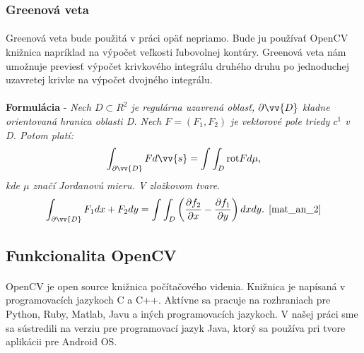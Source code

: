 \documentclass[12pt]{article}
\begin{document}
\subsubsection{Greenová veta}
\paragraph{}
Greenová veta bude použitá v práci opäť nepriamo. Bude ju používať OpenCV knižnica napríklad na výpočet veľkosti ľubovolnej kontúry. Greenová veta nám umožnuje previesť výpočet krivkového integrálu druhého druhu po jednoduchej uzavretej krivke na výpočet dvojného integrálu.
\cite{mat_an_2}	\\ \\
	  	\textbf{Formulácia} - \emph{Nech \begin{math}D \subset R^2 \end{math} je regulárna uzavrená oblasť, \begin{math}\partial \vv{D} \end{math} kladne orientovaná hranica oblasti D. Nech \begin{math} F = (F_1,F_2) \end{math} je vektorové  pole triedy \begin{math} c^1 \end{math} v D. Potom platí:}
	  	\begin{align*}
		\int_{\partial \vv{D}} F d\vv{s} = \int\int_{D} \text{rot} F d \mu \text{,}
		\end{align*}
		\emph{kde \begin{math} \mu \end{math} značí Jordanovú mieru. V zložkovom tvare.} 
		\begin{align*}
		\int_{\partial \vv{D}} F_1 d x + F_2 d y = \int\int_{D} \left ( \frac{\partial f_2}{\partial x} - \frac{\partial f_1}{\partial y} \right ) dxdy \text{. \cite{mat_an_2}}
		\end{align*}
\subsection{Funkcionalita OpenCV}
\paragraph{}
OpenCV je open source knižnica počítačového videnia. Knižnica je napísaná v programovacích jazykoch C a C++. Aktívne sa pracuje na
rozhraniach pre Python, Ruby, Matlab, Javu a iných programovacích jazykoch. V našej práci sme sa sústredili na verziu pre programovací jazyk Java,
ktorý sa používa pri tvore aplikácii pre Android OS.
\cite{learning_opencv}
\end{document}
